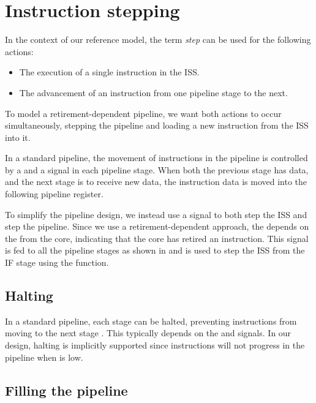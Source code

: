 \section{Instruction stepping}%

In the context of our reference model, the term \textit{step} can be used for the following actions: 
\begin{itemize}
    \item The execution of a single instruction in the ISS.
    \item The advancement of an instruction from one pipeline stage to the next.
\end{itemize}

To model a retirement-dependent pipeline, we want both actions to occur simultaneously, stepping the pipeline and loading a new instruction from the ISS into it.

In a standard pipeline, the movement of instructions in the pipeline is controlled by a  and a  signal in each pipeline stage. When both the previous stage has  data, and the next stage is  to receive new data, the instruction data is moved into the following pipeline register.

To simplify the pipeline design, we instead use a  signal to both step the ISS and step the pipeline.
Since we use a retirement-dependent approach, the  depends on the  from the core, indicating that the core has retired an instruction. This signal is fed to all the pipeline stages as shown in  and is used to step the ISS from the IF stage using the  function.

\subsection{Halting}

In a standard pipeline, each stage can be halted, preventing instructions from moving to the next stage \cite{pattersonComputerOrganizationDesign2021}. This typically depends on the  and  signals. In our design, halting is implicitly supported since instructions will not progress in the pipeline when  is low.

\subsection{Filling the pipeline}

